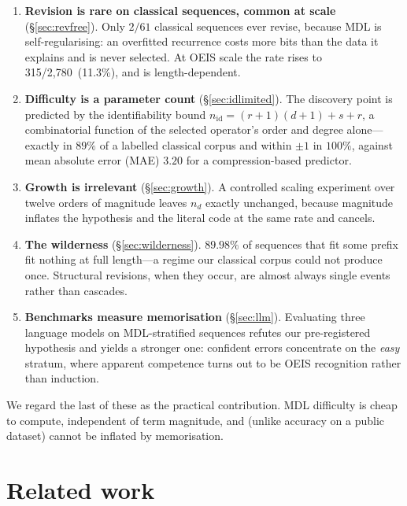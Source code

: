 \documentclass[10pt]{article}
\theoremstyle{definition}
\theoremstyle{plain}
\newcommand{\nid}{n_{\mathrm{id}}}
\newcommand{\nd}{n_{d}}
\newcommand{\oeisHol}{2{,}780}          %
\newcommand{\oeisRev}{315}              %
\newcommand{\oeisRevPct}{11.3\%}        %
\begin{document}
\begin{enumerate}[leftmargin=*,itemsep=1pt,topsep=3pt]
\item \textbf{Revision is rare on classical sequences, common at scale}
(\S\ref{sec:revfree}). Only $2/61$ classical sequences ever revise, because MDL
is self-regularising: an overfitted recurrence costs more bits than the data it
explains and is never selected. At OEIS scale the rate rises to
\oeisRev/\oeisHol\ (\oeisRevPct), and is length-dependent.

\item \textbf{Difficulty is a parameter count} (\S\ref{sec:idlimited}). The
discovery point is predicted by the identifiability bound
$\nid = (r{+}1)(d{+}1) + s + r$, a combinatorial function of the selected
operator's order and degree alone---exactly in $89\%$ of a labelled classical
corpus and within $\pm1$ in $100\%$, against mean absolute error (MAE) $3.20$
for a compression-based predictor.

\item \textbf{Growth is irrelevant} (\S\ref{sec:growth}). A controlled scaling
experiment over twelve orders of magnitude leaves $\nd$ exactly unchanged,
because magnitude inflates the hypothesis and the literal code at the same rate
and cancels.

\item \textbf{The wilderness} (\S\ref{sec:wilderness}). $89.98\%$ of
sequences that fit some prefix fit nothing at full length---a regime our
classical corpus could not produce once. Structural revisions, when they occur,
are almost always single events rather than cascades.

\item \textbf{Benchmarks measure memorisation} (\S\ref{sec:llm}). Evaluating
three language models on MDL-stratified sequences refutes our pre-registered
hypothesis and yields a stronger one: confident errors concentrate on the
\emph{easy} stratum, where apparent competence turns out to be OEIS
recognition rather than induction.
\end{enumerate}

We regard the last of these as the practical contribution. MDL difficulty is
cheap to compute, independent of term magnitude, and (unlike accuracy on a
public dataset) cannot be inflated by memorisation.

\section{Related work}
\label{sec:related}
\end{document}

